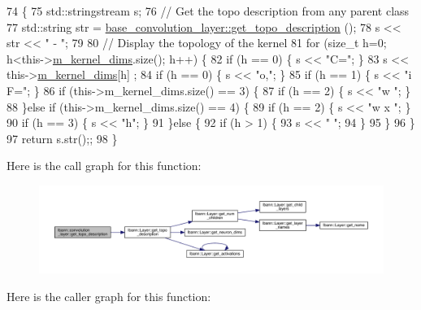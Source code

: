 \begin{DoxyCode}
74                                                   \{
75     std::stringstream s;
76     \textcolor{comment}{// Get the topo description from any parent class}
77     std::string str = \hyperlink{classlbann_1_1Layer_a147a7f7dcf0027a60f10109439e5dcea}{base\_convolution\_layer::get\_topo\_description}
      ();
78     s << str << \textcolor{stringliteral}{" - "};
79 
80     \textcolor{comment}{// Display the topology of the kernel}
81     \textcolor{keywordflow}{for} (\textcolor{keywordtype}{size\_t} h=0; h<this->\hyperlink{classlbann_1_1base__convolution__layer_a283edb6a476f975e713d0b4235ac658f}{m\_kernel\_dims}.size(); h++) \{
82       \textcolor{keywordflow}{if} (h == 0) \{ s << \textcolor{stringliteral}{"C="}; \}
83       s << this->\hyperlink{classlbann_1_1base__convolution__layer_a283edb6a476f975e713d0b4235ac658f}{m\_kernel\_dims}[h] ;
84       \textcolor{keywordflow}{if} (h == 0) \{ s << \textcolor{stringliteral}{"o,"}; \}
85       \textcolor{keywordflow}{if} (h == 1) \{ s << \textcolor{stringliteral}{"i F="}; \}
86       \textcolor{keywordflow}{if} (this->m\_kernel\_dims.size() == 3) \{
87         \textcolor{keywordflow}{if} (h == 2) \{ s << \textcolor{stringliteral}{"w "}; \}
88       \}\textcolor{keywordflow}{else} \textcolor{keywordflow}{if} (this->m\_kernel\_dims.size() == 4) \{
89         \textcolor{keywordflow}{if} (h == 2) \{ s << \textcolor{stringliteral}{"w x "}; \}
90         \textcolor{keywordflow}{if} (h == 3) \{ s << \textcolor{stringliteral}{"h"}; \}
91       \}\textcolor{keywordflow}{else} \{
92         \textcolor{keywordflow}{if} (h > 1) \{
93           s << \textcolor{stringliteral}{" "};
94         \}
95       \}
96     \}
97     \textcolor{keywordflow}{return} s.str();;
98   \}
\end{DoxyCode}
Here is the call graph for this function\+:\nopagebreak
\begin{figure}[H]
\begin{center}
\leavevmode
\includegraphics[width=350pt]{classlbann_1_1convolution__layer_a5af5bb8b7fb68ed4e5085be676788eed_cgraph}
\end{center}
\end{figure}
Here is the caller graph for this function\+:\nopagebreak
